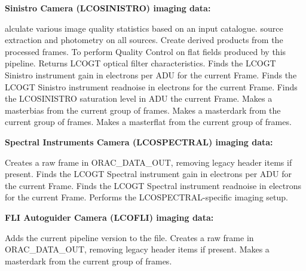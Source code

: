 \documentclass[twoside,11pt,nolof]{starlink}
\begin{document}
\begin{small}
{\large
\begin{center}
\textbf{Sinistro Camera (LCOSINISTRO) imaging data:}
\end{center}
}

\begin{description}
alculate various image quality statistics based on an input catalogue.
source extraction and photometry on all sources.
Create derived products from the processed frames.
To perform Quality Control on flat fields produced by this pipeline.
Returns LCOGT optical filter characteristics.
Finds the LCOGT Sinistro instrument gain in electrons per ADU for the current Frame.
Finds the LCOGT Sinistro instrument readnoise in electrons for the current Frame.
Finds the LCOSINISTRO saturation level in ADU the current Frame.
Makes a masterbias from the current group of frames.
Makes a masterdark from the current group of frames.
Makes a masterflat from the current group of frames.
\end{description}

{\large
\begin{center}
\textbf{Spectral Instruments Camera (LCOSPECTRAL) imaging data:}
\end{center}
}

\begin{description}
Creates a raw frame in ORAC\_DATA\_OUT, removing legacy header items if present.
Finds the LCOGT Spectral instrument gain in electrons per ADU for the current Frame.
Finds the LCOGT Spectral instrument readnoise in electrons for the current Frame.
Performs the LCOSPECTRAL-specific imaging setup.
\end{description}

{\large
\begin{center}
\textbf{FLI Autoguider Camera (LCOFLI) imaging data:}
\end{center}
}

\begin{description}
Adds the current pipeline version to the file.
Creates a raw frame in ORAC\_DATA\_OUT, removing legacy header items if present.
Makes a masterdark from the current group of frames.
\end{description}


\end{small}
\end{document}
